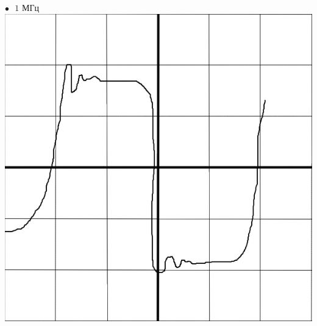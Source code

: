 \documentclass[a4paper,12pt]{article} %
\begin{document}
$\bullet\text{ } 1\text{ МГц }\text{ }\text{ }$
\includegraphics[scale=0.28]{1000000}\\
\end{document}
